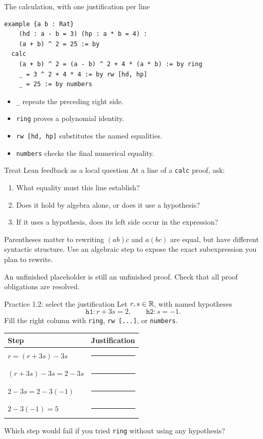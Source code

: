 \begin{frame}[fragile]{The calculation, with one justification per line}
\begin{lstlisting}
example {a b : Rat}
    (hd : a - b = 3) (hp : a * b = 4) :
    (a + b) ^ 2 = 25 := by
  calc
    (a + b) ^ 2 = (a - b) ^ 2 + 4 * (a * b) := by ring
    _ = 3 ^ 2 + 4 * 4 := by rw [hd, hp]
    _ = 25 := by numbers
\end{lstlisting}
\begin{itemize}
\item \texttt{\_} repeats the preceding right side.
\item \texttt{ring} proves a polynomial identity.
\item \texttt{rw [hd, hp]} substitutes the named equalities.
\item \texttt{numbers} checks the final numerical equality.
\end{itemize}
\end{frame}

\begin{frame}{Treat Lean feedback as a local question}
At a line of a \texttt{calc} proof, ask:
\begin{enumerate}
\item What equality must this line establish?
\item Does it hold by algebra alone, or does it use a hypothesis?
\item If it uses a hypothesis, does its left side occur in the expression?
\end{enumerate}
\begin{block}{Parentheses matter to rewriting}
$(ab)c$ and $a(bc)$ are equal, but have different syntactic structure.
Use an algebraic step to expose the exact subexpression you plan to rewrite.
\end{block}
An unfinished placeholder is still an unfinished proof. Check that all proof obligations are resolved.
\end{frame}

\begin{frame}{Practice 1.2: select the justification}
Let $r,s\in\mathbb{R}$, with named hypotheses
\[
\texttt{h1}:r+3s=2,\qquad \texttt{h2}:s=-1.
\]
Fill the right column with \texttt{ring}, \texttt{rw [...]}, or \texttt{numbers}.
\begin{center}
\begin{tabular}{ll}
\toprule
Step & Justification \\
\midrule
$r=(r+3s)-3s$ & \rule{35mm}{0.3pt} \\
$(r+3s)-3s=2-3s$ & \rule{35mm}{0.3pt} \\
$2-3s=2-3(-1)$ & \rule{35mm}{0.3pt} \\
$2-3(-1)=5$ & \rule{35mm}{0.3pt} \\
\bottomrule
\end{tabular}
\end{center}
Which step would fail if you tried \texttt{ring} without using any hypothesis?
\end{frame}

